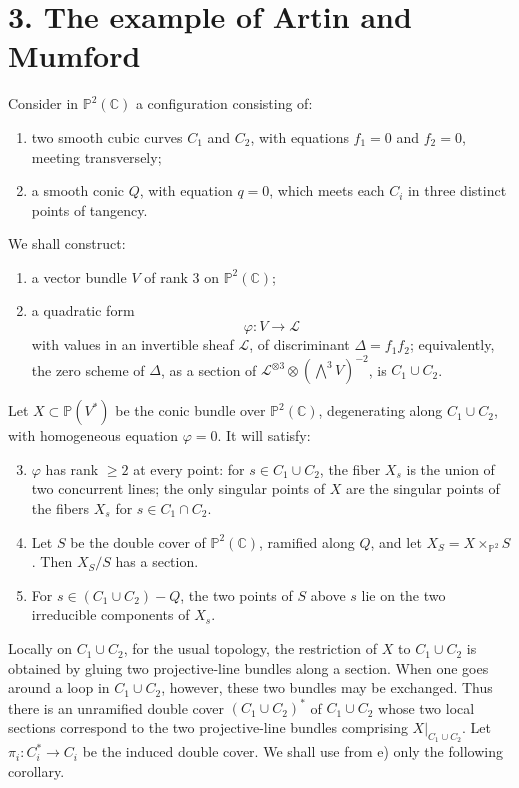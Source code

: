 \documentclass[10pt]{article}
\newcommand{\C}{\mathbb C}
\newcommand{\Pj}{\mathbb P}
\begin{document}
\section*{3. The example of Artin and Mumford}

Consider in \(\Pj^2(\C)\) a configuration consisting of:
\begin{enumerate}[label=\alph*)]
\item two smooth cubic curves \(C_1\) and \(C_2\), with equations \(f_1=0\) and \(f_2=0\), meeting transversely;
\item a smooth conic \(Q\), with equation \(q=0\), which meets each \(C_i\) in three distinct points of tangency.
\end{enumerate}
We shall construct:
\begin{enumerate}[label=\alph*)]
\item a vector bundle \(V\) of rank \(3\) on \(\Pj^2(\C)\);
\item a quadratic form
\[
\varphi:V\longrightarrow \mathcal L
\]
with values in an invertible sheaf \(\mathcal L\), of discriminant \(\Delta=f_1f_2\); equivalently, the zero scheme of \(\Delta\), as a section of \(\mathcal L^{\otimes3}\otimes(\bigwedge^3V)^{-2}\), is \(C_1\cup C_2\).
\end{enumerate}
Let \(X\subset\Pj(V^*)\) be the conic bundle over \(\Pj^2(\C)\), degenerating along \(C_1\cup C_2\), with homogeneous equation \(\varphi=0\). It will satisfy:
\begin{enumerate}[label=\alph*)]
\setcounter{enumi}{2}
\item \(\varphi\) has rank \(\ge2\) at every point: for \(s\in C_1\cup C_2\), the fiber \(X_s\) is the union of two concurrent lines; the only singular points of \(X\) are the singular points of the fibers \(X_s\) for \(s\in C_1\cap C_2\).
\item Let \(S\) be the double cover of \(\Pj^2(\C)\), ramified along \(Q\), and let \(X_S=X\times_{\Pj^2}S\). Then \(X_S/S\) has a section.
\item For \(s\in(C_1\cup C_2)-Q\), the two points of \(S\) above \(s\) lie on the two irreducible components of \(X_s\).
\end{enumerate}
Locally on \(C_1\cup C_2\), for the usual topology, the restriction of \(X\) to \(C_1\cup C_2\) is obtained by gluing two projective-line bundles along a section. When one goes around a loop in \(C_1\cup C_2\), however, these two bundles may be exchanged. Thus there is an unramified double cover \((C_1\cup C_2)^*\) of \(C_1\cup C_2\) whose two local sections correspond to the two projective-line bundles comprising \(X|_{C_1\cup C_2}\). Let \(\pi_i:C_i^*\to C_i\) be the induced double cover. We shall use from e) only the following corollary.
\end{document}
